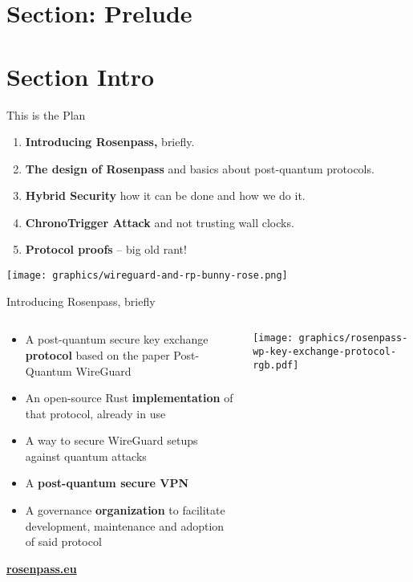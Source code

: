 \section{Section: Prelude}

\section{Section Intro}

\begin{frame}[s]{This is the Plan}
  \begin{enumerate}
    \item \textbf{Introducing Rosenpass,} briefly.
    \item \textbf{The design of Rosenpass} and basics about post-quantum protocols.
    \item \textbf{Hybrid Security} how it can be done and how we do it.
    \item \textbf{ChronoTrigger Attack} and not trusting wall clocks.
    \item \textbf{Protocol proofs} – big old rant!
  \end{enumerate}

  \begin{center}
    \texttt{[image: graphics/wireguard-and-rp-bunny-rose.png]}
  \end{center}
\end{frame}



\begin{frame}{Introducing Rosenpass, briefly}
  \begin{columns}[fullwidth,c]

    \begin{column}{.5\linewidth}
      \begin{itemize}
        \item A post-quantum secure key exchange \textbf{protocol}
          {\small based on the paper Post-Quantum WireGuard\citePqwg}
        \item An open-source Rust \textbf{implementation} of that protocol, already in use
        \item A way to secure WireGuard setups against quantum attacks
        \item A \textbf{post-quantum secure VPN}
        \item A governance \textbf{organization} to facilitate development, maintenance and adoption of said protocol
      \end{itemize}
      \bigskip
      \textbf{\url{rosenpass.eu}}
    \end{column}%
    \begin{column}{.5\linewidth}
      \texttt{[image: graphics/rosenpass-wp-key-exchange-protocol-rgb.pdf]}
    \end{column}
  \end{columns}
\end{frame}
